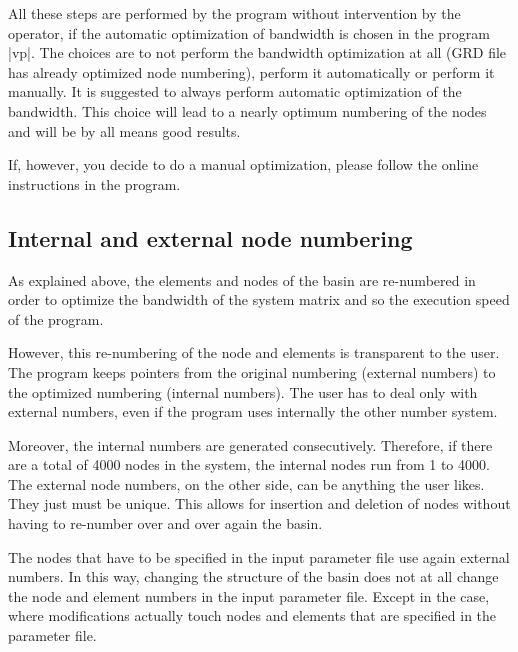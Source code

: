 All these steps are performed by the program without
intervention by the operator, if the automatic optimization
of bandwidth is chosen in the program |vp|. The choices
are to not perform the bandwidth optimization at all
(GRD file has already optimized node numbering), perform
it automatically or perform it manually. It is suggested
to always perform automatic optimization of the bandwidth.
This choice will lead to a nearly optimum numbering of the
nodes and will be by all means good results.

If, however, you decide to do a manual optimization, please
follow the online instructions in the program.

\subsection{Internal and external node numbering}

As explained above, the elements and nodes of the basin are re-numbered 
in order to optimize the bandwidth of the system matrix and so
the execution speed of the program. 

However, this re-numbering of the node and elements is transparent
to the user. The program keeps pointers from the original numbering
(external numbers) to the optimized numbering (internal numbers).
The user has to deal only with external numbers, even if the 
program uses internally the other number system.

Moreover, the internal numbers are generated consecutively.
Therefore, if there are a total of 4000 nodes in the system, the internal
nodes run from 1 to 4000. The external node numbers,
on the other side, can be anything the user likes. They just must be
unique. This allows for insertion and deletion of nodes without
having to re-number over and over again the basin.

The nodes that have to be specified in the input parameter file
use again external numbers. In this way, changing the structure of
the basin does not at all change the node and element numbers in the
input parameter file. Except in the case, where modifications
actually touch nodes and elements that are specified in the 
parameter file.

